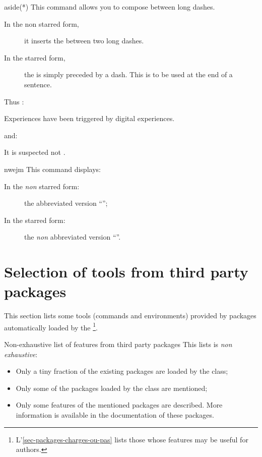 \documentclass[english,nolocaltoc]{nwejmart}
\newtheorem[style=definition]{fact}
\newtheorem[title=experience]{experience}
\newtheorem[title-plural=rings]{ring}
\newtheorem[title=ideal,title-plural=ideals]{ideal}
\begin{document}
\begin{docCommand}{aside(*)}{}
  This command allows you to compose   between long dashes.
  \begin{description}
  \item[In the non starred form,] it inserts the    between
    two long dashes.
  \item[In the starred form,]  the  is simply preceded by a
    dash. This is to be used at the end of a sentence.
  \end{description}
  Thus :
  \begin{bodycode}
Experiences  have been triggered by digital experiences.   
\end{bodycode}
  and:
\begin{bodycode}[listing and text,listing options={deletekeywords={example}}]
It is suspected not  .
\end{bodycode}
\end{docCommand}

\begin{docCommand}{nwejm}{}
  This command displays:
  \begin{description}
  \item[In the \emph{non} starred form:] the abbreviated version \enquote{\nwejm{}};
  \item[In the  starred form:] the \emph{non} abbreviated version \enquote{\nwejm*{}}.
  \end{description}
\end{docCommand}

\section{Selection of tools from third party packages}

This section lists some tools (commands and environments) provided by
packages automatically loaded by the
\nwejmauthorcl\footnote{L'\vref{sec-packages-charges-ou-pas} lists
  those whose features may be useful for authors.}.

\begin{dbwarning}{Non-exhaustive list of features from third party packages}{}
  This lists is  \emph{non exhaustive}:
  \begin{itemize}
  \item Only a tiny fraction of the existing packages are loaded by
    the class;
  \item Only some of the packages loaded by the class are mentioned;
  \item Only some features of the mentioned packages are
    described. More information is available in the documentation of
    these packages.
  \end{itemize}
\end{dbwarning}
\end{document}
